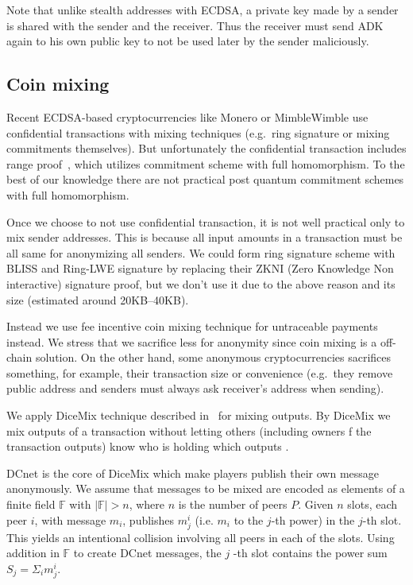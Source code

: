 \documentclass[a4paper,10pt,twocolumn]{article}
\begin{document}
	Note that unlike stealth addresses with ECDSA, a private key made by a sender is shared with the sender and the receiver.
	Thus the receiver must send ADK again to his own public key to not be used later by the sender  maliciously.

	\subsection{Coin mixing}

	Recent ECDSA-based cryptocurrencies like Monero or MimbleWimble use confidential transactions with mixing techniques (e.g.\ ring signature or mixing commitments themselves).
	But unfortunately the confidential transaction includes range proof~\cite{bullet}, which utilizes commitment scheme with full homomorphism.
	To the best of our knowledge there are not practical post quantum commitment schemes with full homomorphism.
	
Once we choose to not use confidential transaction, it is not well practical only to mix sender addresses.
This is because all input amounts in a transaction must be all same for anonymizing all senders.
We could form ring signature scheme with BLISS and Ring-LWE signature by replacing their ZKNI (Zero Knowledge Non interactive) signature proof, but we don't use
it due to the above reason and its size (estimated around 20KB--40KB).

	Instead we use fee incentive coin mixing  technique for  untraceable payments instead.
	We stress that we  sacrifice less for anonymity since coin mixing is a off-chain solution.	
	On the other hand, some anonymous cryptocurrencies sacrifices something, for example, their transaction size or convenience (e.g.\ they remove public address and
	senders must always ask receiver's address when sending). 

	\vspace{2.5mm}

We apply DiceMix technique described in~\cite{mixing} for mixing outputs. By DiceMix we mix outputs of a transaction 
without letting others (including owners f the transaction outputs) know who is holding which outputs  .


DCnet is the core of DiceMix which make players publish  their  own  message anonymously. 
We assume that messages to be mixed are encoded as elements of a finite field \( \mathbb{F} \) with \( |\mathbb{F}|> n \), 
where \( n\) is the number of peers \( P \). Given \( n\) slots, each peer \(i\),  with  message \(m_i\), 
publishes \(m_j^i\) (i.e. \(m_i\) to  the \(j\)-th power)  in  the \(j\)-th  slot. 
This  yields  an  intentional  collision involving  all  peers  in  each  of  the  slots.
 Using  addition in  \( \mathbb{F} \) to  create  DCnet  messages,  the \(j\) -th  slot contains the power sum \( S_j=\Sigma_{i}m_j^i\).
\end{document}
